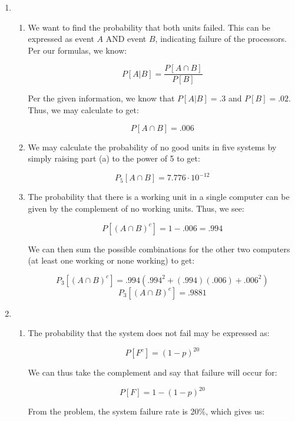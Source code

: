 \begin{enumerate}

  \item

    \begin{enumerate}

      \item We want to find the probability that both units failed. This can be expressed as event $A$ AND event $B$, indicating failure of the processors. Per our formulas, we know:

        $$P[A|B]=\frac{P[A\cap B]}{P[B]}$$

        Per the given information, we know that $P[A|B]=.3$ and $P[B]=.02$. Thus, we may calculate to get:

        $$\boxed{P[A\cap B]=.006}$$

      \item We may calculate the probability of no good units in five systems by simply raising part (a) to the power of 5 to get:

        $$\boxed{P_5[A\cap B]=7.776\cdot10^{-12}}$$

      \item The probability that there is a working unit in a single computer can be given by the complement of no working units. Thus, we see:

        $$P[(A\cap B)^c]=1-.006=.994$$

        We can then sum the possible combinations for the other two computers (at least one working or none working) to get:

        $$P_3[(A\cap B)^c]=.994(.994^2+(.994)(.006)+.006^2)$$
        $$\boxed{P_3[(A\cap B)^c]=.9881}$$

    \end{enumerate}

  \item

    \begin{enumerate}

      \item The probability that the system does not fail may be expressed as:

        $$P[F^c]=(1-p)^{20}$$

        We can thus take the complement and say that failure will occur for:

        $$P[F]=1-(1-p)^{20}$$

        From the problem, the system failure rate is 20\%, which gives us:


\end{enumerate}
\end{enumerate}
